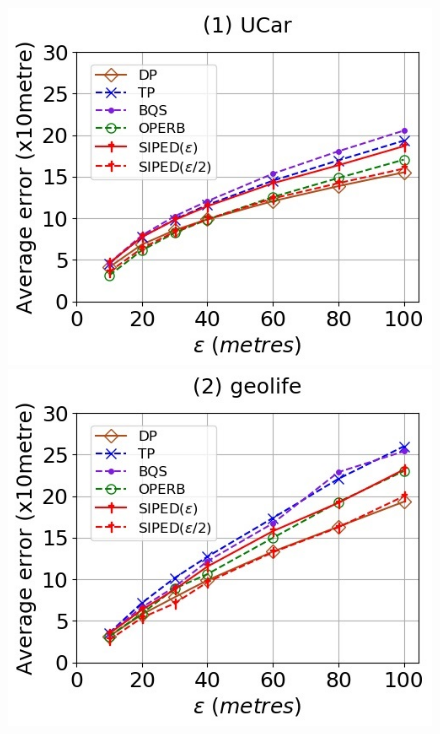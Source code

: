 \begin{figure}[tb!]
	\centering
	\includegraphics[scale = 0.400]{Figures/Exp-where-PED-error-epsilon-service.jpg}\hspace{2ex}
	\includegraphics[scale = 0.400]{Figures/Exp-where-PED-error-epsilon-geolife.jpg}\hspace{2ex}

\end{figure}
